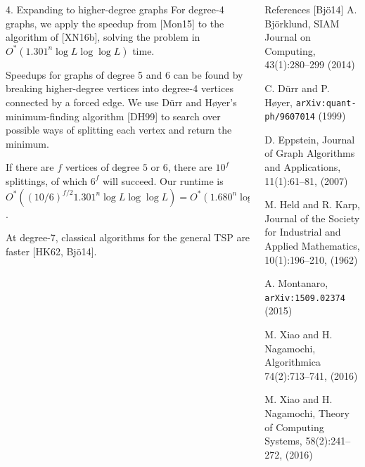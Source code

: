\documentclass[]{templates/poster}
\begin{document}
\begin{frame}{}
\begin{columns}[t]
\begin{column}{0.422\linewidth}
\begin{block}{\Large 4. Expanding to higher-degree graphs}
  For degree-4 graphs, we apply the speedup from [Mon15] to the algorithm of [XN16b], solving the problem in $O^*(1.301^n\log L \log\log L)$ time.
  
  Speedups for graphs of degree 5 and 6 can be found by breaking higher-degree vertices into degree-4 vertices connected by a forced edge. We use D\"urr and H\o yer's minimum-finding algorithm [DH99] to search over possible ways of splitting each vertex and return the minimum.
  
  If there are $f$ vertices of degree $5$ or $6$, there are $10^f$ splittings, of which $6^f$ will succeed. Our runtime is  $O^*((10/6)^{f/2}1.301^n\log L\log\log L) = O^*(1.680^n\log L\log\log L)$.

  At degree-7, classical algorithms for the general TSP are faster [HK62, Bj\"o14].
  \end{block}
  \end{column}

  \begin{column}{0.422\linewidth}
  \begin{block}{\Large References}
  [Bj\"o14] A. Bj{\"o}rklund, SIAM Journal on Computing, 43(1):280--299 (2014)

  \noindent[DH99] C. D\"urr and P. H\o yer, {\tt arXiv:quant-ph/9607014} (1999)

  \noindent[Epp07] D. Eppstein, Journal of Graph Algorithms and Applications, 11(1):61--81, (2007)

  \noindent[HK62] M. Held and R. Karp, Journal of the Society for Industrial and Applied Mathematics, 10(1):196--210, (1962)

  \noindent[Mon15] A. Montanaro, {\tt arXiv:1509.02374} (2015)

  \noindent[XN16a] M. Xiao and H. Nagamochi, Algorithmica 74(2):713--741, (2016)

  \noindent[XN16b] M. Xiao and H. Nagamochi, Theory of Computing Systems, 58(2):241--272, (2016)
  \end{block}
  \end{column}
\end{columns}

\end{frame}

\end{document}
